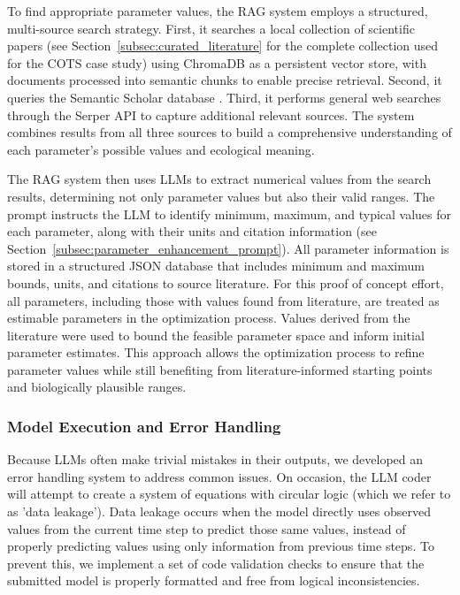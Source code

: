 To find appropriate parameter values, the RAG system employs a structured, multi-source search strategy. First, it searches a local collection of scientific papers (see Section~\ref{subsec:curated_literature} for the complete collection used for the COTS case study) using ChromaDB \citep{Chroma2024} as a persistent vector store, with documents processed into semantic chunks to enable precise retrieval. Second, it queries the Semantic Scholar database \citep{semantic_scholar_api}. Third, it performs general web searches through the Serper API \citep{serper_api} to capture additional relevant sources. The system combines results from all three sources to build a comprehensive understanding of each parameter's possible values and ecological meaning.

The RAG system then uses LLMs to extract numerical values from the search results, determining not only parameter values but also their valid ranges. The prompt instructs the LLM to identify minimum, maximum, and typical values for each parameter, along with their units and citation information (see Section~\ref{subsec:parameter_enhancement_prompt}). All parameter information is stored in a structured JSON database that includes minimum and maximum bounds, units, and citations to source literature. For this proof of concept effort, all parameters, including those with values found from literature, are treated as estimable parameters in the optimization process. Values derived from the literature were used to bound the feasible parameter space and inform initial parameter estimates. This approach allows the optimization process to refine parameter values while still benefiting from literature-informed starting points and biologically plausible ranges.

\subsubsection{Model Execution and Error Handling}
Because LLMs often make trivial mistakes in their outputs, we developed an error handling system to address common issues. On occasion, the LLM coder will attempt to create a system of equations with circular logic (which we refer to as 'data leakage'). Data leakage occurs when the model directly uses observed values from the current time step to predict those same values, instead of properly predicting values using only information from previous time steps. To prevent this, we implement a set of code validation checks to ensure that the submitted model is properly formatted and free from logical inconsistencies.

